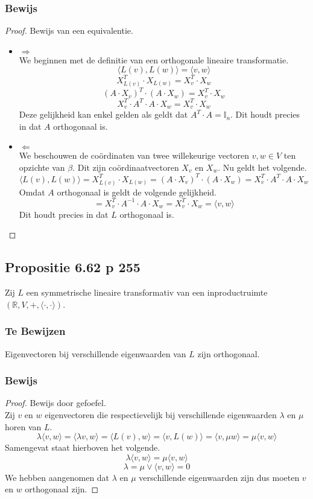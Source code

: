 \documentclass[lineaire_algebra_oplossingen.tex]{subfiles}
\begin{document}
\subsubsection*{Bewijs}
\begin{proof}
Bewijs van een equivalentie.
\begin{itemize}
\item $\Rightarrow$\\
We beginnen met de definitie van een orthogonale lineaire transformatie.
\[
\langle L(v),L(w) \rangle = \langle v,w \rangle
\]
\[
X_{L(v)}^T \cdot X_{L(w)} = X_v^T \cdot X_w 
\]
\[
(A\cdot X_{v})^T \cdot (A\cdot X_{w}) = X_v^T \cdot X_w 
\]
\[
X_v^{T}\cdot A^T \cdot A \cdot X_{w} = X_v^T \cdot X_w 
\]
Deze gelijkheid kan enkel gelden als geldt dat $A^T \cdot A = \mathbb{I}_n$.
Dit houdt precies in dat $A$ orthogonaal is.

\item $\Leftarrow$\\
We beschouwen de co\"ordinaten van twee willekeurige vectoren $v,w \in V$ ten opzichte van $\beta$.
Dit zijn co\"ordinaatvectoren $X_v$ en $X_w$.
Nu geldt het volgende.
\[
\langle L(v),L(w) \rangle = X_{L(v)}^T \cdot X_{L(w)} = (A\cdot X_{v})^T \cdot (A\cdot X_{w}) = X_v^{T}\cdot A^T \cdot A \cdot X_{w}
\]
Omdat $A$ orthogonaal is geldt de volgende gelijkheid.
\[
 = X_v^{T}\cdot A^{-1} \cdot A \cdot X_{w} = X_v^T \cdot X_w  = \langle v,w \rangle
\]
Dit houdt precies in dat $L$ orthogonaal is.
\end{itemize}
\end{proof}

\subsection{Propositie 6.62 p 255}
Zij $L$ een symmetrische lineaire transformativ van een inproductruimte $(\mathbb{R},V,+,\langle \cdot,\cdot \rangle)$.
\subsubsection*{Te Bewijzen}
Eigenvectoren bij verschillende eigenwaarden van $L$ zijn orthogonaal.
\subsubsection*{Bewijs}
\begin{proof}
Bewijs door gefoefel.\\
Zij $v$ en $w$ eigenvectoren die respectievelijk bij verschillende eigenwaarden $\lambda$ en $\mu$ horen van $L$.
\[
\lambda \langle v,w \rangle = \langle \lambda v,w \rangle = \langle L(v),w \rangle = \langle v,L(w) \rangle = \langle v,\mu w \rangle = \mu \langle v,w \rangle
\]
Samengevat staat hierboven het volgende.
\[
\lambda \langle v,w \rangle =\mu \langle v,w \rangle
\]
\[
\lambda = \mu \vee \langle v,w \rangle = 0
\]
We hebben aangenomen dat $\lambda$ en $\mu$ verschillende eigenwaarden zijn dus moeten $v$ en $w$ orthogonaal zijn.
\end{proof}
\end{document}
